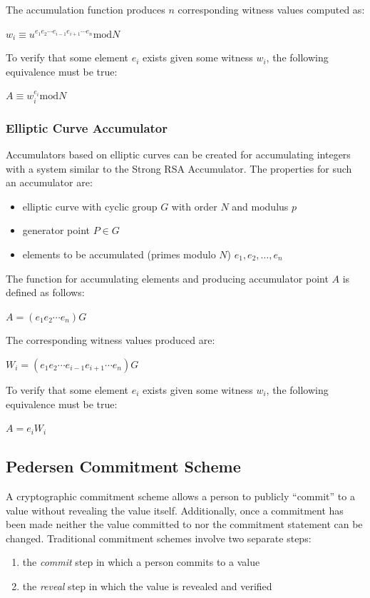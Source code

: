 \documentclass[11pt]{article}
\begin{document}
The accumulation function produces $n$ corresponding witness values computed as:
\begin{center}
    $w_i \equiv u^{e_1 e_2 \cdots e_{i-1} e_{i+1} \cdots e_n} \textrm{mod} N$
\end{center}

To verify that some element $e_i$ exists given some witness $w_i$, the following equivalence must be true:
\begin{center}
    $A \equiv w_i^{e_i} \textrm{mod} N$
\end{center}

\subsubsection{Elliptic Curve Accumulator}
Accumulators based on elliptic curves can be created for accumulating integers with a system similar to the Strong RSA
Accumulator. The properties for such an accumulator are:
\begin{itemize}
    \item elliptic curve with cyclic group $G$ with order $N$ and modulus $p$
    \item generator point $P \in G$ 
    \item elements to be accumulated (primes modulo $N$) $e_1, e_2, \ldots, e_n$
\end{itemize}

The function for accumulating elements and producing accumulator point $A$ is defined as follows:
\begin{center}
    $A = (e_1 e_2 \cdots e_n) G$
\end{center}

The corresponding witness values produced are:
\begin{center}
    $W_i = (e_1 e_2 \cdots e_{i-1} e_{i+1} \cdots e_n) G$
\end{center}

To verify that some element $e_i$ exists given some witness $w_i$, the following equivalence must be true:
\begin{center}
    $A = e_i W_i$
\end{center}

\subsection{Pedersen Commitment Scheme}
A cryptographic commitment scheme allows a person to publicly ``commit'' to a value without revealing the value itself.
Additionally, once a commitment has been made neither the value committed to nor the commitment statement can be
changed. Traditional commitment schemes involve two separate steps:
\begin{enumerate}
    \item the \emph{commit} step in which a person commits to a value
    \item the \emph{reveal} step in which the value is revealed and verified
\end{enumerate}
\end{document}

